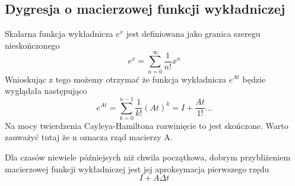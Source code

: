 \documentclass{article}
\begin{document}
	\subsection{Dygresja o macierzowej funkcji wykładniczej}
		Skalarna funkcja wykładnicza $e^x$ jest definiowana jako granica szeregu
		nieskończonego
		\begin{equation}
			e^x = \sum^{\infty}_{n=0}\frac{1}{n!}x^n
		\end{equation}
		Wnioskując z tego możemy otrzymać że funkcja wykładnicza $e^{At}$ będzie wyglądała następująco
		\begin{equation}
			e^{At} = \sum^{n-1}_{k=0}\frac{1}{k!}(At)^k = I+\frac{At}{1!} ...
		\end{equation}
		Na mocy twierdzenia Cayleya-Hamiltona rozwinięcie to jest skończone.
		Warto zauważyć tutaj że n oznacza rząd macierzy A.

		Dla czasów niewiele późniejsych niż chwila początkowa, dobrym przybliżeniem
		macierzowej funkcji wykładniczej jest jej aproksymacja pierwszego rzędu
		\begin{equation}
			I+A\Delta t
		\end{equation}
\end{document}
